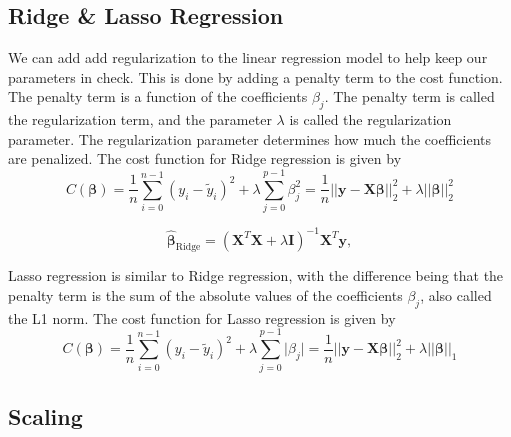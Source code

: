 \documentclass[twoside,11pt]{report}
\begin{document}
\subsection{Ridge \& Lasso Regression}
\label{sec:ridge}

We can add add regularization to the linear regression model to help keep our parameters in check. 
This is done by adding a penalty term to the cost function. The penalty term is a function of the coefficients $\beta_j$. 
The penalty term is called the regularization term, and the parameter $\lambda$ is called the regularization parameter. 
The regularization parameter determines how much the coefficients are penalized. The cost function for Ridge regression is given by
$$
C(\mathbf{\beta}) = \frac{1}{n}\sum_{i=0}^{n-1}(y_i-\tilde{y}_i)^2 + \lambda\sum_{j=0}^{p-1}\beta_j^2  
=\frac{1}{n}\vert\vert \mathbf{y}-\mathbf{X}\mathbf{\beta}\vert\vert_2^2 + \lambda\vert\vert\mathbf{\beta}\vert\vert_2^2
$$




$$
\hat{\mathbf{\beta}}_{\mathrm{Ridge}} = \left(\mathbf{X}^T\mathbf{X}+\lambda\mathbf{I}\right)^{-1}\mathbf{X}^T\mathbf{y},
$$


Lasso regression is similar to Ridge regression, with the difference being that the penalty term is the sum of the absolute values of the coefficients $\beta_j$, also called 
the L1 norm. The cost function for Lasso regression is given by
$$
C(\mathbf{\beta}) = \frac{1}{n}\sum_{i=0}^{n-1}(y_i-\tilde{y}_i)^2 + \lambda\sum_{j=0}^{p-1}\vert\beta_j\vert
=\frac{1}{n}\vert\vert \mathbf{y}-\mathbf{X}\mathbf{\beta}\vert\vert_2^2 + \lambda\vert\vert\mathbf{\beta}\vert\vert_1
$$




\subsection{Scaling}
\label{sec:scaling}
\end{document}
